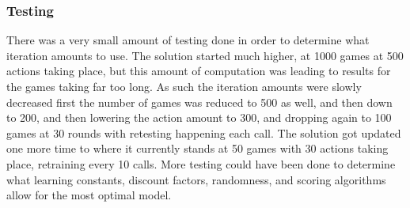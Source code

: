 \documentclass[letterpaper, 10 pt, conference]{ieeeconf}   %
\begin{document}
\subsubsection{Testing}
There was a very small amount of testing done in order to determine what iteration amounts to use. The solution started much higher, at 1000 games at 500
actions taking place, but this amount of computation was leading to results for the games taking far too long. As such the iteration amounts were slowly decreased
first the number of games was reduced to 500 as well, and then down to 200, and then lowering the action amount to 300, and dropping again to 100 games at 30 rounds with retesting happening each call.
The solution got updated one more time to where it currently stands at 50 games with 30 actions taking place,
retraining every 10 calls. More testing could have been done to determine what learning constants, discount factors, randomness,
and scoring algorithms allow for the most optimal model.
\end{document}
